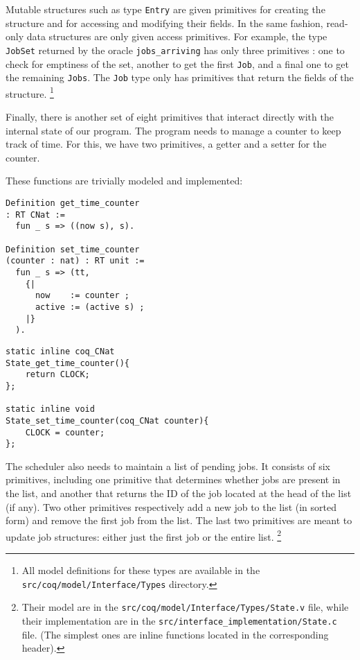 	Mutable structures such as type \texttt{Entry} are given primitives for creating the structure and for accessing and modifying their fields. In the same fashion, read-only data structures are only given access primitives. For example, the type \texttt{JobSet} returned by the oracle \texttt{jobs\_arriving} has only three primitives : one to check for emptiness of the set, another to get the first \texttt{Job}, and a final one to get the remaining \texttt{Jobs}. The \texttt{Job} type only has primitives that return the fields of the structure. \footnote{All model definitions for these types are available in the \texttt{src/coq/model/Interface/Types} directory.}


	Finally, there is another set of eight primitives that interact directly with the internal state of our program. The program needs to manage a counter to keep track of time. For this, we have two primitives, a getter and a setter for the counter.

	These functions are trivially modeled and implemented:

	\begin{verbatim}
Definition get_time_counter
: RT CNat :=
  fun _ s => ((now s), s).

Definition set_time_counter
(counter : nat) : RT unit :=
  fun _ s => (tt,
    {|
      now    := counter ;
      active := (active s) ;
    |}
  ).
	\end{verbatim}

	\begin{verbatim}
static inline coq_CNat
State_get_time_counter(){
    return CLOCK;
};

static inline void
State_set_time_counter(coq_CNat counter){
    CLOCK = counter;
};
	\end{verbatim}
	The scheduler also needs to maintain a list of pending jobs. It consists of six primitives, including one primitive that determines whether jobs are present in the list, and another that returns the ID of the job located at the head of the list (if any). Two other primitives respectively add a new job to the list (in sorted form) and remove the first job from the list. The last two primitives are meant to update job structures: either just the first job or the entire list. \footnote{Their model are in the \texttt{src/coq/model/Interface/Types/State.v} file, while their implementation are in the \texttt{src/interface\_implementation/State.c} file. (The simplest ones are inline functions located in the corresponding header).}

